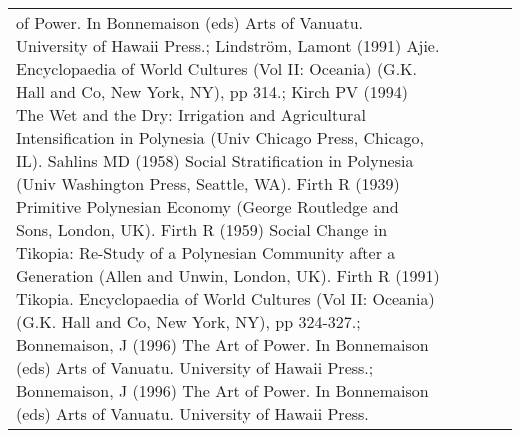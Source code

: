 \begin{longtable}{p{1.8cm}p{1.8cm}p{1.8cm}p{2cm}p{7cm}}
of Power. In Bonnemaison (eds) Arts of Vanuatu. University of Hawaii Press.; Lindström, Lamont (1991) Ajie. Encyclopaedia of World Cultures (Vol II: Oceania) (G.K. Hall and Co, New York, NY), pp 314.; Kirch PV (1994) The Wet and the Dry: Irrigation and Agricultural Intensification in Polynesia (Univ Chicago Press, Chicago, IL). Sahlins MD (1958) Social Stratification in Polynesia (Univ Washington Press, Seattle, WA). Firth R (1939) Primitive Polynesian Economy (George Routledge and Sons, London, UK). Firth R (1959) Social Change in Tikopia: Re-Study of a Polynesian Community after a Generation (Allen and Unwin, London, UK). Firth R (1991) Tikopia. Encyclopaedia of World Cultures (Vol II: Oceania) (G.K. Hall and Co, New York, NY), pp 324-327.; Bonnemaison, J (1996) The Art of Power. In Bonnemaison (eds) Arts of Vanuatu. University of Hawaii Press.; Bonnemaison, J (1996) The Art of Power. In Bonnemaison (eds) Arts of Vanuatu. University of Hawaii Press. \\ 

\end{longtable}
